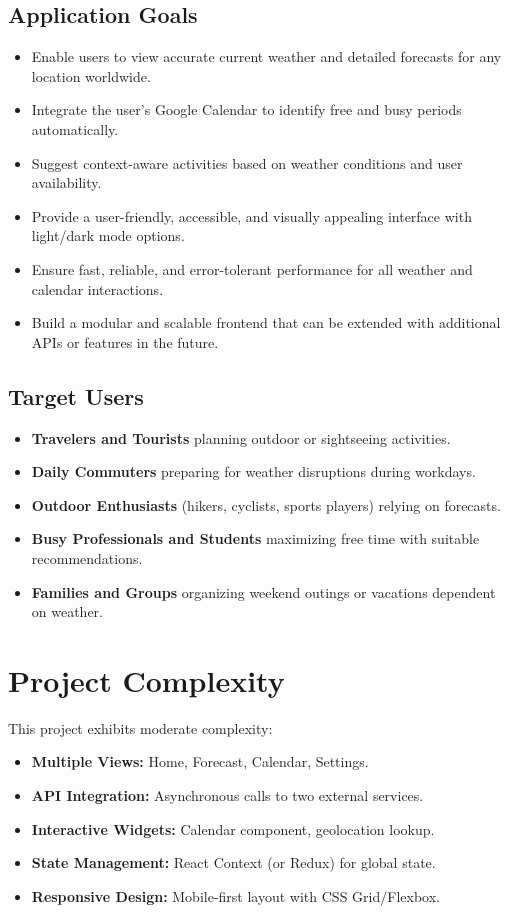\documentclass[12pt,a4paper]{article}
\begin{document}
\subsection{Application Goals}
\begin{itemize}[nosep]
  \item Enable users to view accurate current weather and detailed forecasts for any location worldwide.
  \item Integrate the user’s Google Calendar to identify free and busy periods automatically.
  \item Suggest context-aware activities based on weather conditions and user availability.
  \item Provide a user-friendly, accessible, and visually appealing interface with light/dark mode options.
  \item Ensure fast, reliable, and error-tolerant performance for all weather and calendar interactions.
  \item Build a modular and scalable frontend that can be extended with additional APIs or features in the future.
\end{itemize}

\subsection{Target Users}
\begin{itemize}[nosep]
  \item \textbf{Travelers and Tourists} planning outdoor or sightseeing activities.
  \item \textbf{Daily Commuters} preparing for weather disruptions during workdays.
  \item \textbf{Outdoor Enthusiasts} (hikers, cyclists, sports players) relying on forecasts.
  \item \textbf{Busy Professionals and Students} maximizing free time with suitable recommendations.
  \item \textbf{Families and Groups} organizing weekend outings or vacations dependent on weather.
\end{itemize}

\section{Project Complexity}
This project exhibits moderate complexity:
\begin{itemize}[nosep]
  \item \textbf{Multiple Views:} Home, Forecast, Calendar, Settings.
  \item \textbf{API Integration:} Asynchronous calls to two external services.
  \item \textbf{Interactive Widgets:} Calendar component, geolocation lookup.
  \item \textbf{State Management:} React Context (or Redux) for global state.
  \item \textbf{Responsive Design:} Mobile-first layout with CSS Grid/Flexbox.
\end{itemize}
\end{document}
